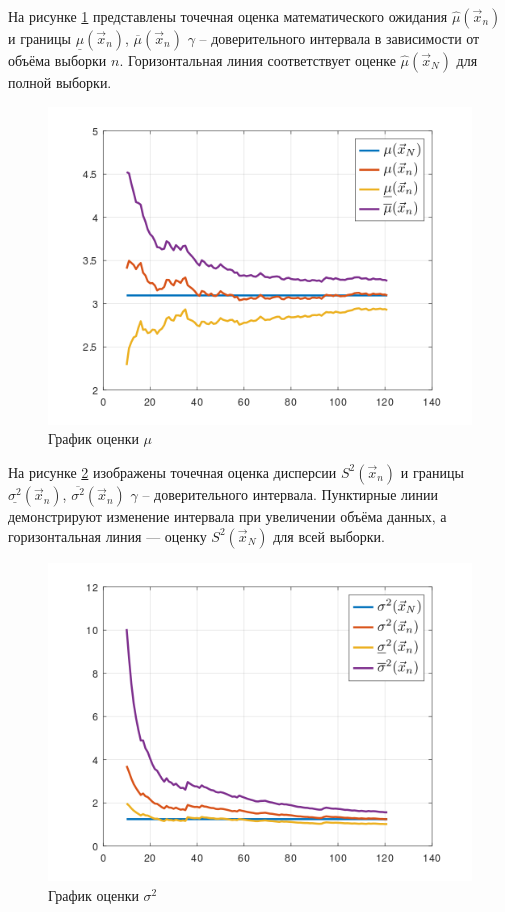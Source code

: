 На рисунке \ref{image:graph1} представлены точечная оценка математического ожидания $\hat{\mu}(\vec{x}_n)$ и границы $\underline{\mu}(\vec{x}_n)$, $\overline{\mu}(\vec{x}_n)$ $\gamma$ -- доверительного интервала в зависимости от объёма выборки $n$. Горизонтальная линия соответствует оценке $\hat{\mu}(\vec{x}_N)$ для полной выборки.  

\begin{figure}[h]
    \centering
	\includegraphics[scale=0.65]{./img/mu.png}
	\caption{График оценки $\mu$}
	\label{image:graph1}
\end{figure}

На рисунке \ref{image:graph2} изображены точечная оценка дисперсии $S^2(\vec{x}_n)$ и границы $\underline{\sigma^2}(\vec{x}_n)$, $\overline{\sigma^2}(\vec{x}_n)$ $\gamma$ -- доверительного интервала. Пунктирные линии демонстрируют изменение интервала при увеличении объёма данных, а горизонтальная линия — оценку $S^2(\vec{x}_N)$ для всей выборки.  

\begin{figure}[h]
	\centering
	\includegraphics[scale=0.65]{./img/sigma2.png}
	\caption{График оценки $\sigma^2$}
	\label{image:graph2}
\end{figure}
